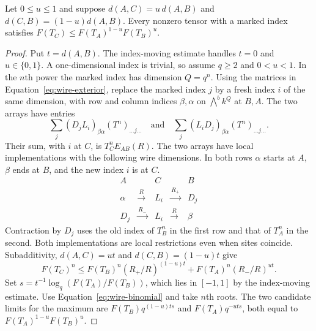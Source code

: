 \begin{lemma}\label{lem:wire-one-index}
Let $0\le u\le1$ and suppose $d(A,C)=u\,d(A,B)$ and
$d(C,B)=(1-u)d(A,B)$. Every nonzero tensor with a marked index
satisfies $F(T_C)\le F(T_A)^{1-u}F(T_B)^u$.
\end{lemma}
\begin{proof}
Put $t=d(A,B)$. The index-moving estimate handles $t=0$ and
$u\in\{0,1\}$. A one-dimensional index is trivial, so assume $q\ge2$
and $0<u<1$. In the $n$th power the marked index has dimension $Q=q^n$.
Using the matrices in Equation~\eqref{eq:wire-exterior}, replace the
marked index $j$ by a fresh index $i$ of the same dimension, with row
and column indices $\beta,\alpha$ on $\bigwedge^b k^Q$ at $B,A$.
The two arrays have entries
\[
   \sum_j(D_jL_i)_{\beta\alpha}(T^n)_{\ldots j\ldots}
   \quad\text{and}\quad
   \sum_j(L_iD_j)_{\beta\alpha}(T^n)_{\ldots j\ldots}.
\]
Their sum, with $i$ at $C$, is $T_C^n E_{AB}(R)$.
The two arrays have local implementations with the following wire
dimensions. In both rows $\alpha$ starts at $A$, $\beta$ ends at $B$,
and the new index $i$ is at $C$.
\[
\begin{array}{ccccc}
 A && C && B\\[2pt]
 \alpha & \xrightarrow{\ R\ } & L_i & \xrightarrow{\ R_+\ } & D_j\\[2pt]
 D_j & \xrightarrow{\ R_-\ } & L_i & \xrightarrow{\ R\ } & \beta
\end{array}
\]
Contraction by $D_j$ uses the old index of $T_B^n$ in the first row
and that of $T_A^n$ in the second. Both implementations are local
restrictions even when sites coincide. Subadditivity, $d(A,C)=ut$ and $d(C,B)=(1-u)t$
give
\[
 F(T_C)^n\le F(T_B)^n(R_+/R)^{(1-u)t}
                    +F(T_A)^n(R_-/R)^{ut}.
\]
Set $s=t^{-1}\log_q(F(T_A)/F(T_B))$, which lies in $[-1,1]$ by the
index-moving estimate. Use Equation~\eqref{eq:wire-binomial} and take
$n$th roots. The two candidate limits for the maximum are
$F(T_B)q^{(1-u)ts}$ and $F(T_A)q^{-uts}$, both equal to
$F(T_A)^{1-u}F(T_B)^u$.
\end{proof}

